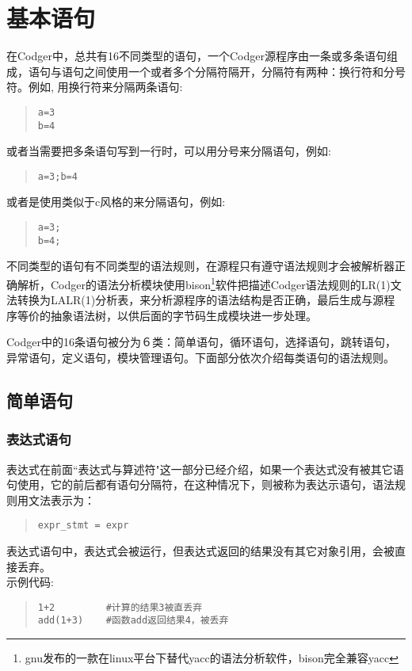 \section{基本语句}
在Codger中，总共有16不同类型的语句，一个Codger源程序由一条或多条语句组成，语句与语句之间使用一个或者多个分隔符隔开，分隔符有两种：换行符和分号符。例如, 用换行符来分隔两条语句:
\begin{quote}
\begin{verbatim}
a=3
b=4
\end{verbatim}
\end{quote}
或者当需要把多条语句写到一行时，可以用分号来分隔语句，例如:
\begin{quote}
\begin{verbatim}
a=3;b=4
\end{verbatim}
\end{quote}
或者是使用类似于c风格的来分隔语句，例如:
\begin{quote}
\begin{verbatim}
a=3;
b=4; 
\end{verbatim}
\end{quote}
不同类型的语句有不同类型的语法规则，在源程只有遵守语法规则才会被解析器正确解析，Codger的语法分析模块使用bison\footnote{gnu发布的一款在linux平台下替代yacc的语法分析软件，bison完全兼容yacc}软件把描述Codger语法规则的LR(1)文法转换为LALR(1)分析表，来分析源程序的语法结构是否正确，最后生成与源程序等价的抽象语法树，以供后面的字节码生成模块进一步处理。

Codger中的16条语句被分为６类：简单语句，循环语句，选择语句，跳转语句，异常语句，定义语句，模块管理语句。下面部分依次介绍每类语句的语法规则。

\subsection{简单语句}
\subsubsection{表达式语句}
表达式在前面``表达式与算述符"这一部分已经介绍，如果一个表达式没有被其它语句使用，它的前后都有语句分隔符，在这种情况下，则被称为表达示语句，语法规则用文法表示为：
\begin{quote}
\begin{verbatim}
expr_stmt = expr 
\end{verbatim}
\end{quote}
表达式语句中，表达式会被运行，但表达式返回的结果没有其它对象引用，会被直接丢弃。\\
示例代码:
\begin{quote}
\begin{verbatim}
1+2         #计算的结果3被直丢弃
add(1+3)    #函数add返回结果4，被丢弃
\end{verbatim}
\end{quote}

